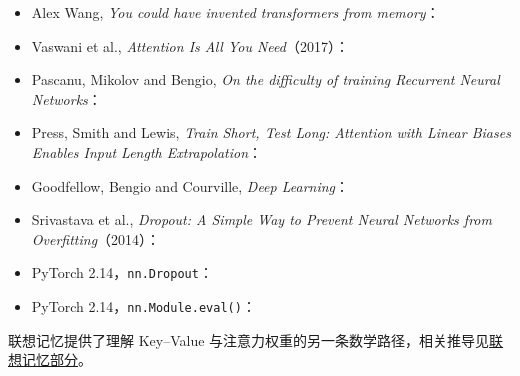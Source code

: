 \begin{itemize}
\item {}\label{source:alex-wang}Alex Wang, \emph{You could have invented transformers from memory}：
\item {}\label{source:attention-original}Vaswani et al., \emph{Attention Is All You Need}（2017）：
\item {}\label{source:rnn-training}Pascanu, Mikolov and Bengio, \emph{On the difficulty of training Recurrent Neural Networks}：
\item {}\label{source:alibi}Press, Smith and Lewis, \emph{Train Short, Test Long: Attention with Linear Biases Enables Input Length Extrapolation}：
\item Goodfellow, Bengio and Courville, \emph{Deep Learning}：
\item {}\label{source:dropout}Srivastava et al.,
\emph{Dropout: A Simple Way to Prevent Neural Networks from Overfitting}（2014）：
\item {}\label{source:pytorch-dropout}PyTorch 2.14，\texttt{nn.Dropout}：
\item PyTorch 2.14，\texttt{nn.Module.eval()}：
\end{itemize}

联想记忆提供了理解 Key--Value 与注意力权重的另一条数学路径，相关推导见\hyperref[intro:key-value-outer-product]{联想记忆部分}。

